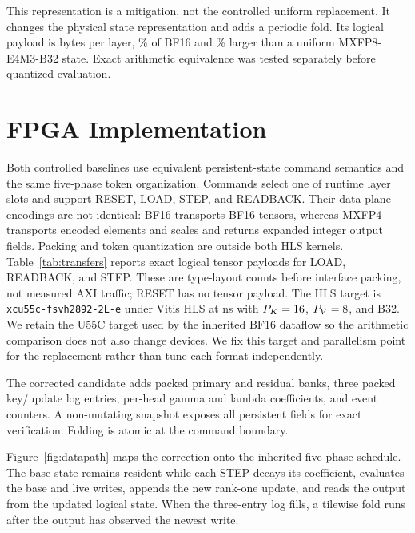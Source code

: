 \documentclass[conference]{IEEEtran}
\begin{document}
This representation is a mitigation, not the controlled uniform replacement.
It changes the physical state representation and adds a periodic fold. Its
logical payload is \RsTwoLogicalStateBytes{} bytes per layer,
\RsTwoStatePercentOfBfSixteen{}\% of BF16 and
\RsTwoStatePercentAboveMxfpEight{}\% larger than a uniform MXFP8-E4M3-B32
state. Exact arithmetic equivalence was tested separately before quantized
evaluation.

\section{FPGA Implementation}
Both controlled baselines use equivalent persistent-state command semantics and
the same five-phase token organization. Commands select one of
\CorrectedNumLayers{} runtime layer slots and support RESET, LOAD, STEP, and
READBACK. Their data-plane encodings are not identical: BF16 transports BF16
tensors, whereas MXFP4 transports encoded elements and scales and returns
expanded integer output fields. Packing and token quantization are outside both
HLS kernels. Table~\ref{tab:transfers} reports exact logical tensor payloads
for LOAD, READBACK, and STEP. These are type-layout counts before interface
packing, not measured AXI traffic; RESET has no tensor payload. The HLS target is
\texttt{xcu55c-fsvh2892-2L-e} under Vitis HLS
\CorrectedHlsToolVersion{} at \CorrectedTargetClockNs{} ns with
$P_K=16$, $P_V=8$, and B32.
We retain the U55C target used by the inherited BF16 dataflow so the arithmetic
comparison does not also change devices. We fix this target and parallelism
point for the replacement rather than tune each format independently.

The corrected candidate adds packed primary and residual banks, three packed
key/update log entries, per-head gamma and lambda
coefficients, and event counters. A non-mutating snapshot exposes all
persistent fields for exact verification. Folding is atomic at the command
boundary.

\begin{table}[t]
\centering
\caption{Logical command payload sizes before AXI packing.}
\label{tab:transfers}
\footnotesize

\end{table}

Figure~\ref{fig:datapath} maps the correction onto the inherited five-phase
schedule. The base state remains resident while each STEP decays its
coefficient, evaluates the base and live writes, appends the new rank-one
update, and reads the output from the updated logical state. When the
three-entry log fills, a tilewise fold runs after the output
has observed the newest write.
\end{document}

